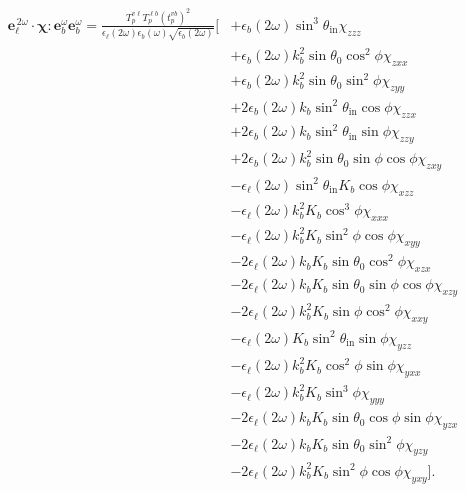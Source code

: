 \begin{equation*}
\begin{split}
\mathbf{e}^{\,2\omega}_{\ell}\cdot
\boldsymbol{\chi}:\mathbf{e}^{\omega}_{b}\mathbf{e}^{\omega}_{b} = 
\frac{T^{v\ell}_{p}T^{\ell b}_{p}\left(t^{vb}_{p}\right)^{2}}
     {\epsilon_{\ell}({2\omega})\epsilon_{b}(\omega)\sqrt{\epsilon_{b}(2\omega)}}
\bigg[
&+ \epsilon_{b}(2\omega)\sin^{3}\theta_{\mathrm{in}}\chi_{zzz}\\
&+ \epsilon_{b}(2\omega)k^{2}_{b}\sin\theta_{0}\cos^{2}\phi\chi_{zxx}\\
&+ \epsilon_{b}(2\omega)k^{2}_{b}\sin\theta_{0}\sin^{2}\phi\chi_{zyy}\\
&+ 2\epsilon_{b}(2\omega)k_{b}\sin^{2}\theta_{\mathrm{in}}\cos\phi\chi_{zzx}\\
&+ 2\epsilon_{b}(2\omega)k_{b}\sin^{2}\theta_{\mathrm{in}}\sin\phi\chi_{zzy}\\
&+ 2\epsilon_{b}(2\omega)k^{2}_{b}\sin\theta_{0}\sin\phi\cos\phi\chi_{zxy}\\
&- \epsilon_{\ell}(2\omega)\sin^{2}\theta_{\mathrm{in}}K_{b}\cos\phi\chi_{xzz}\\
&- \epsilon_{\ell}(2\omega)k^{2}_{b}K_{b}\cos^{3}\phi\chi_{xxx}\\
&- \epsilon_{\ell}(2\omega)k^{2}_{b}K_{b}\sin^{2}\phi\cos\phi\chi_{xyy}\\
&- 2\epsilon_{\ell}(2\omega)k_{b}K_{b}\sin\theta_{0}\cos^{2}\phi\chi_{xzx}\\
&- 2\epsilon_{\ell}(2\omega)k_{b}K_{b}\sin\theta_{0}\sin\phi\cos\phi\chi_{xzy}\\
&- 2\epsilon_{\ell}(2\omega)k^{2}_{b}K_{b}\sin\phi\cos^{2}\phi\chi_{xxy}\\
&- \epsilon_{\ell}(2\omega)K_{b}\sin^{2}\theta_{\mathrm{in}}\sin\phi\chi_{yzz}\\
&- \epsilon_{\ell}(2\omega)k^{2}_{b}K_{b}\cos^{2}\phi\sin\phi\chi_{yxx}\\
&- \epsilon_{\ell}(2\omega)k^{2}_{b}K_{b}\sin^{3}\phi\chi_{yyy}\\
&- 2\epsilon_{\ell}(2\omega)k_{b}K_{b}\sin\theta_{0}\cos\phi\sin\phi\chi_{yzx}\\
&- 2\epsilon_{\ell}(2\omega)k_{b}K_{b}\sin\theta_{0}\sin^{2}\phi\chi_{yzy}\\
&- 2\epsilon_{\ell}(2\omega)k^{2}_{b}K_{b}\sin^{2}\phi\cos\phi\chi_{yxy}
\bigg].
\end{split}
\end{equation*}

